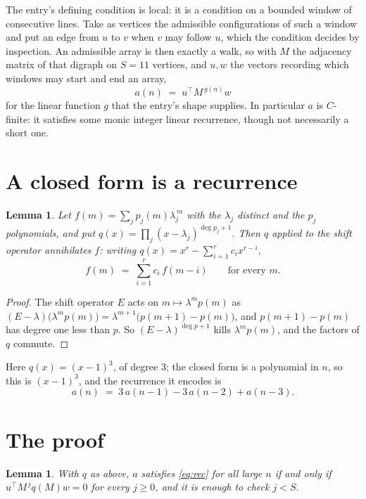 \documentclass[11pt,a4paper]{article}
\theoremstyle{plain}
\newtheorem{lemma}[theorem]{Lemma}
\theoremstyle{definition}
\begin{document}
The entry's defining condition is local: it is a condition on a bounded window of consecutive lines. Take as vertices the
admissible configurations of such a window and put an edge from $u$ to $v$ when $v$ may
follow $u$, which the condition decides by inspection. An admissible array is then exactly a
walk, so with $M$ the adjacency matrix of that digraph on $S=11$ vertices, and $u,w$ the
vectors recording which windows may start and end an array,
\[
a(n)\;=\;u^{\!\top}M^{\,g(n)}w
\]
for the linear function $g$ that the entry's shape supplies. In particular $a$ is
$C$-finite: it satisfies some monic integer linear recurrence, though not necessarily a short
one.

\section{A closed form is a recurrence}

\begin{lemma}\label{lem:ann}
Let $f(m)=\sum_{j}p_j(m)\lambda_j^{\,m}$ with the $\lambda_j$ distinct and the $p_j$
polynomials, and put $q(x)=\prod_j(x-\lambda_j)^{\deg p_j+1}$. Then $q$ applied to the shift
operator annihilates $f$: writing $q(x)=x^{r}-\sum_{i=1}^{r}c_ix^{r-i}$,
\[
f(m)\;=\;\sum_{i=1}^{r}c_i\,f(m-i)\qquad\text{for every }m.
\]
\end{lemma}

\begin{proof}
The shift operator $E$ acts on $m\mapsto\lambda^{m}p(m)$ as
$(E-\lambda)\bigl(\lambda^{m}p(m)\bigr)=\lambda^{m+1}\bigl(p(m+1)-p(m)\bigr)$, and
$p(m+1)-p(m)$ has degree one less than $p$. So $(E-\lambda)^{\deg p+1}$ kills
$\lambda^{m}p(m)$, and the factors of $q$ commute.
\end{proof}

Here $q(x)=(x-1)^{3}$, of degree $3$; the closed form is a polynomial in $n$, so this is $(x-1)^{3}$, and the recurrence it encodes is
\begin{equation}\label{eq:rec}
a(n)\;=\;3\,a(n-1) - 3\,a(n-2) + a(n-3).
\end{equation}

\section{The proof}

\begin{lemma}\label{lem:crit}
With $q$ as above, $a$ satisfies \eqref{eq:rec} for all large $n$ if and only if
$u^{\!\top}M^{\,j}q(M)w=0$ for every $j\ge0$, and it is enough to check $j<S$.
\end{lemma}
\end{document}
